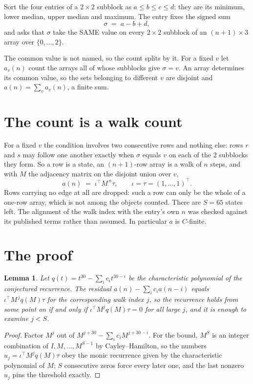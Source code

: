\documentclass[11pt,a4paper]{article}
\theoremstyle{plain}
\newtheorem{lemma}[theorem]{Lemma}
\theoremstyle{definition}
\begin{document}
Sort the four entries of a $2\times2$ subblock as $a\le b\le c\le d$: they
are its minimum, lower median, upper median and maximum. The entry fixes the signed sum
\[
\sigma\;=\;a-b+d,
\]
and asks that $\sigma$ take the SAME value on every $2\times2$ subblock of an
$(n+1)\times3$ array over $\{0,\dots,2\}$.

The common value is not named, so the count splits by it. For a fixed $v$ let $a_v(n)$ count
the arrays all of whose subblocks give $\sigma=v$. An array determines its common value, so
the sets belonging to different $v$ are disjoint and $a(n)=\sum_v a_v(n)$, a finite sum.


\section{The count is a walk count}

For a fixed $v$ the condition involves two consecutive rows and nothing
else: rows $r$ and $s$ may follow one another exactly when $\sigma$ equals $v$ on each of the
$2$ subblocks they form. So a row is a state, an $(n+1)$-row array is a walk of $n$
steps, and with $M$ the adjacency matrix on the disjoint union over $v$,
\[
a(n)\;=\;\iota^{\!\top}M^{\,n}\tau,\qquad\iota=\tau=(1,\dots,1)^{\!\top} .
\]
Rows carrying no edge at all are dropped: such a row can only be the whole of a one-row
array, which is not among the objects counted. There are $S=65$ states left.
The alignment of the walk index with the entry's own $n$ was checked against its published
terms rather than assumed. In particular $a$ is $C$-finite.

\section{The proof}

\begin{lemma}\label{lem:crit}
Let $q(t)=t^{30}-\sum_i c_it^{30-i}$ be the characteristic polynomial of the
conjectured recurrence. The residual $a(n)-\sum_ic_ia(n-i)$ equals
$\iota^{\!\top}M^{\,j}q(M)\tau$ for the corresponding walk index $j$, so the recurrence
holds from some point on if and only if $\iota^{\!\top}M^{j}q(M)\tau=0$ for all large $j$,
and it is enough to examine $j<S$.
\end{lemma}

\begin{proof}
Factor $M^{j}$ out of $M^{j+30}-\sum_ic_iM^{j+30-i}$. For the bound, $M^{S}$
is an integer combination of $I,M,\dots,M^{S-1}$ by Cayley--Hamilton, so the numbers
$u_j=\iota^{\!\top}M^{j}q(M)\tau$ obey the monic recurrence given by the characteristic
polynomial of $M$; $S$ consecutive zeros force every later one, and the last nonzero $u_j$
pins the threshold exactly.
\end{proof}
\end{document}
